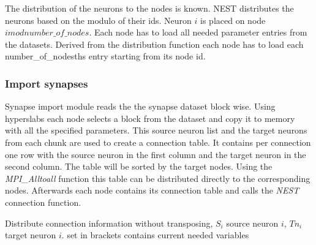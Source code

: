 \documentclass[a4paper]{article}
\begin{document}
The distribution of the neurons to the nodes is known. NEST distributes the neurons based on the modulo of their ids. Neuron $i$ is placed on node $i mod number\_of\_nodes$. Each node has to load all needed parameter entries
from the datasets. Derived from the distribution function each node has to load each number\_of\_nodesths entry
starting from its node id.

\subsubsection{Import synapses}
Synapse import module reads the the synapse dataset block wise. Using hyperslabs each node selects a block from the
dataset and copy it to memory with all the specified parameters.
This source neuron list and the target neurons from each chunk are used to create a connection table.
It contains per connection one row with the source neuron in the first column and the target neuron in the second column.
The table will be sorted by the target nodes.
Using the \emph{MPI\_Alltoall} function this table can be distributed directly to the corresponding nodes.
Afterwards each node contains its connection table and calls the \emph{NEST} connection function.
\begin{algorithm}
\label{alg2}
\caption{Distribute connection information without transposing, $S_i$ source neuron $i$, $Tn_i$ target neuron $i$.
	set in brackets contains current needed variables}
\end{algorithm}
\end{document}

